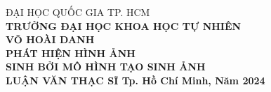 \begin{titlepage}
\begin{center}
\fontsize{13pt}{20pt}\selectfont
ĐẠI HỌC QUỐC GIA TP. HCM\\
\bfseries TRƯỜNG ĐẠI HỌC KHOA HỌC TỰ NHIÊN\\[4cm]
%
\fontsize{14pt}{20pt}\selectfont
{VÕ HOÀI DANH\\[3cm]}
%
\fontsize{16pt}{20pt}\selectfont
{PHÁT HIỆN HÌNH ẢNH \\SINH BỞI MÔ HÌNH TẠO SINH ẢNH \\[3cm]}
%
\fontsize{14pt}{20pt}\selectfont
{LUẬN VĂN THẠC SĨ}
%
\vfill
\fontsize{12pt}{20pt}\selectfont
\textnormal{Tp. Hồ Chí Minh, Năm 2024}
%
\end{center}
%
\end{titlepage}